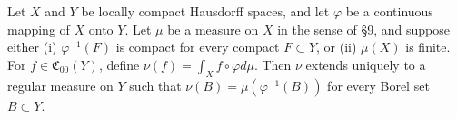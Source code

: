 Let $X$ and $Y$ be locally compact Hausdorff spaces, and let $\varphi$ be a continuous mapping of $X$ onto $Y$. Let $\mu$ be a measure on $X$ in the sense of §9, and suppose either (i) $\varphi^{-1}(F)$ is compact for every compact $F \subset Y$, or (ii) $\mu(X)$ is finite. For $f \in \mathfrak{C}_{00}(Y)$, define $\nu(f) = \int_X f \circ \varphi d\mu$. Then $\nu$ extends uniquely to a regular measure on $Y$ such that $\nu(B) = \mu(\varphi^{-1}(B))$ for every Borel set $B \subset Y$.
